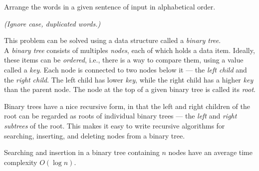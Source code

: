 

\problem Arrange the words in a given sentence of input in alphabetical order.

\textit{(Ignore case, duplicated words.)} 

\solution This problem can be solved using a data structure called a \textit{binary tree}.\\

A \textit{binary tree} consists of multiples \textit{nodes}, each of which holds a data item. Ideally, 
these items can be \textit{ordered}, i.e., there is a way to compare them, using a value called a \textit{key}.
Each node is connected to two nodes below it --- the \textit{left child} and the \textit{right child}. The left child
has  lower \textit{key}, while the right child has a higher \textit{key} than the parent node. The node at the top 
of a given binary tree is called its \textit{root}.

Binary trees have a nice recursive form, in that the left and right children of the root can be regarded as roots of 
individual binary trees --- the \textit{left} and \textit{right} \textit{subtrees} of the root. This makes it easy to
write recursive algorithms for searching, inserting, and deleting nodes from a binary tree.

Searching and insertion in a binary tree containing $n$ nodes have an average time complexity $O(\log{n})$.

